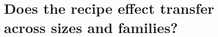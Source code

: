 \documentclass{article}
\begin{document}
\section{Does the recipe effect transfer across sizes and families?}
\label{sec:transfer}
\end{document}
